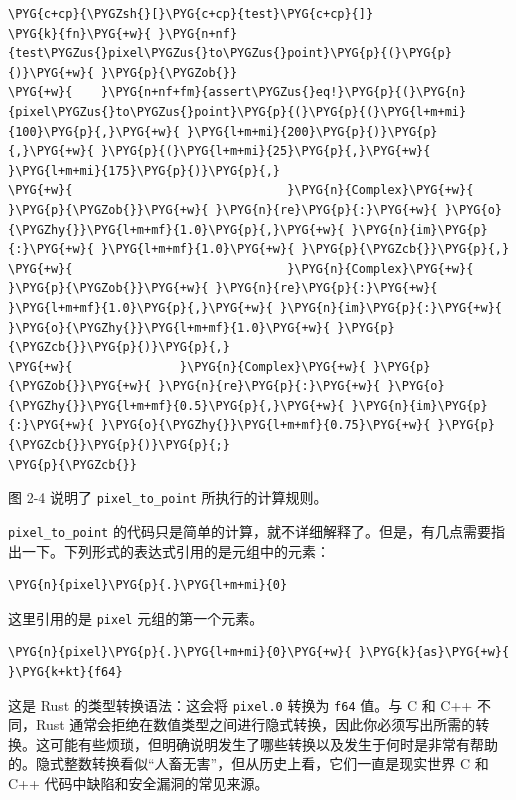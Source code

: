 \begin{Verbatim}[commandchars=\\\{\},breaklines=true,breakanywhere=true,fontsize=\codefont,xleftmargin=17bp]
\PYG{c+cp}{\PYGZsh{}[}\PYG{c+cp}{test}\PYG{c+cp}{]}
\PYG{k}{fn}\PYG{+w}{ }\PYG{n+nf}{test\PYGZus{}pixel\PYGZus{}to\PYGZus{}point}\PYG{p}{(}\PYG{p}{)}\PYG{+w}{ }\PYG{p}{\PYGZob{}}
\PYG{+w}{    }\PYG{n+nf+fm}{assert\PYGZus{}eq!}\PYG{p}{(}\PYG{n}{pixel\PYGZus{}to\PYGZus{}point}\PYG{p}{(}\PYG{p}{(}\PYG{l+m+mi}{100}\PYG{p}{,}\PYG{+w}{ }\PYG{l+m+mi}{200}\PYG{p}{)}\PYG{p}{,}\PYG{+w}{ }\PYG{p}{(}\PYG{l+m+mi}{25}\PYG{p}{,}\PYG{+w}{ }\PYG{l+m+mi}{175}\PYG{p}{)}\PYG{p}{,}
\PYG{+w}{                              }\PYG{n}{Complex}\PYG{+w}{ }\PYG{p}{\PYGZob{}}\PYG{+w}{ }\PYG{n}{re}\PYG{p}{:}\PYG{+w}{ }\PYG{o}{\PYGZhy{}}\PYG{l+m+mf}{1.0}\PYG{p}{,}\PYG{+w}{ }\PYG{n}{im}\PYG{p}{:}\PYG{+w}{ }\PYG{l+m+mf}{1.0}\PYG{+w}{ }\PYG{p}{\PYGZcb{}}\PYG{p}{,}
\PYG{+w}{                              }\PYG{n}{Complex}\PYG{+w}{ }\PYG{p}{\PYGZob{}}\PYG{+w}{ }\PYG{n}{re}\PYG{p}{:}\PYG{+w}{ }\PYG{l+m+mf}{1.0}\PYG{p}{,}\PYG{+w}{ }\PYG{n}{im}\PYG{p}{:}\PYG{+w}{ }\PYG{o}{\PYGZhy{}}\PYG{l+m+mf}{1.0}\PYG{+w}{ }\PYG{p}{\PYGZcb{}}\PYG{p}{)}\PYG{p}{,}
\PYG{+w}{               }\PYG{n}{Complex}\PYG{+w}{ }\PYG{p}{\PYGZob{}}\PYG{+w}{ }\PYG{n}{re}\PYG{p}{:}\PYG{+w}{ }\PYG{o}{\PYGZhy{}}\PYG{l+m+mf}{0.5}\PYG{p}{,}\PYG{+w}{ }\PYG{n}{im}\PYG{p}{:}\PYG{+w}{ }\PYG{o}{\PYGZhy{}}\PYG{l+m+mf}{0.75}\PYG{+w}{ }\PYG{p}{\PYGZcb{}}\PYG{p}{)}\PYG{p}{;}
\PYG{p}{\PYGZcb{}}
\end{Verbatim}

图 2-4 说明了 \texttt{pixel\_to\_point} 所执行的计算规则。


\texttt{pixel\_to\_point} 的代码只是简单的计算，就不详细解释了。但是，有几点需要指出一下。下列形式的表达式引用的是元组中的元素：

\begin{Verbatim}[commandchars=\\\{\},breaklines=true,breakanywhere=true,fontsize=\codefont,xleftmargin=17bp]
\PYG{n}{pixel}\PYG{p}{.}\PYG{l+m+mi}{0}
\end{Verbatim}

这里引用的是 \texttt{pixel} 元组的第一个元素。

\begin{Verbatim}[commandchars=\\\{\},breaklines=true,breakanywhere=true,fontsize=\codefont,xleftmargin=17bp]
\PYG{n}{pixel}\PYG{p}{.}\PYG{l+m+mi}{0}\PYG{+w}{ }\PYG{k}{as}\PYG{+w}{ }\PYG{k+kt}{f64}
\end{Verbatim}

这是 Rust 的类型转换语法：这会将 \texttt{pixel.0} 转换为 \texttt{f64} 值。与 C 和 C++ 不同，Rust 通常会拒绝在数值类型之间进行隐式转换，因此你必须写出所需的转换。这可能有些烦琐，但明确说明发生了哪些转换以及发生于何时是非常有帮助的。隐式整数转换看似“人畜无害”，但从历史上看，它们一直是现实世界 C 和 C++ 代码中缺陷和安全漏洞的常见来源。


